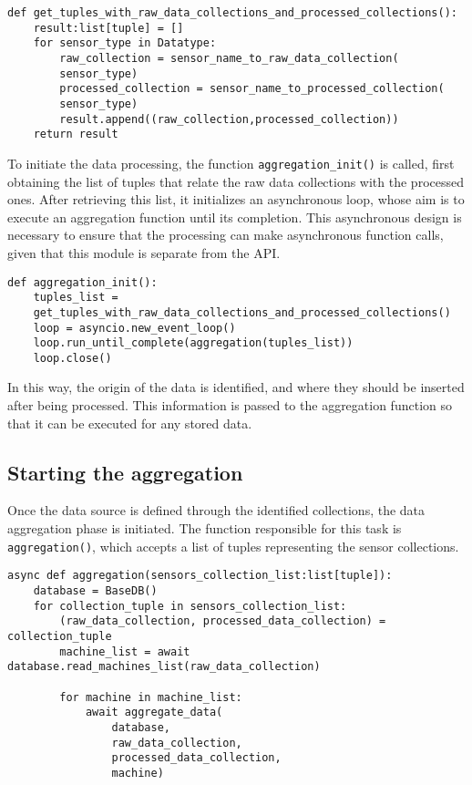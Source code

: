 \begin{verbatim}
def get_tuples_with_raw_data_collections_and_processed_collections():
    result:list[tuple] = []
    for sensor_type in Datatype:
        raw_collection = sensor_name_to_raw_data_collection(
        sensor_type)
        processed_collection = sensor_name_to_processed_collection(
        sensor_type)
        result.append((raw_collection,processed_collection))
    return result
\end{verbatim}

To initiate the data processing, the function \texttt{aggregation\_init()} is called, first obtaining the list of tuples that relate the raw data collections with the processed ones. After retrieving this list, it initializes an asynchronous loop, whose aim is to execute an aggregation function until its completion. This asynchronous design is necessary to ensure that the processing can make asynchronous function calls, given that this module is separate from the \gls{API}.

\begin{verbatim}
def aggregation_init():
    tuples_list = 
    get_tuples_with_raw_data_collections_and_processed_collections()
    loop = asyncio.new_event_loop()
    loop.run_until_complete(aggregation(tuples_list))
    loop.close()
\end{verbatim}

In this way, the origin of the data is identified, and where they should be inserted after being processed. This information is passed to the aggregation function so that it can be executed for any stored data.

\subsection{Starting the aggregation}
Once the data source is defined through the identified collections, the data aggregation phase is initiated. The function responsible for this task is \texttt{aggregation()}, which accepts a list of tuples representing the sensor collections.

\begin{verbatim}
async def aggregation(sensors_collection_list:list[tuple]):
    database = BaseDB()
    for collection_tuple in sensors_collection_list:
        (raw_data_collection, processed_data_collection) = collection_tuple
        machine_list = await database.read_machines_list(raw_data_collection)

        for machine in machine_list:
            await aggregate_data(
                database,
                raw_data_collection,
                processed_data_collection,
                machine)
\end{verbatim}

